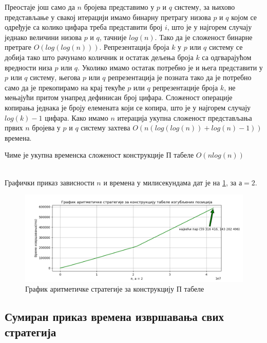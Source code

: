 \documentclass[a4paper]{article}
\begin{document}
Преостаје још само да $ n $ бројева представимо у $ p $ и $ q $ систему, за њихово представљање у свакој итерацији имамо бинарну претрагу низова $ p $ и $ q $ којом се одређује са колико цифара треба представити број $ i $, што је у најгорем случају једнако величини низова $ p $ и $ q $, тачније $ log(n) $. Тако да је сложеност бинарне претраге $ O(log(log(n))) $. Репрезентација броја $ k $ у $ p $ или $ q $ систему се добија тако што рачунамо количник и остатак дељења броја $ k $ са одгварајућом вредности низа $ p $ или $ q $. Уколико имамо остатак потребно је и њега представити у $ p $ или $ q $ систему, његова $ p $ или $ q $ репрезентација је позната тако да је потребно само да је прекопирамо на крај текуће $ p $ или $ q $ репрезентације броја $ k $, не мењајући притом унапред дефинисан број цифара. Сложеност операције копирања једнака је броју елемената који се копира, што је у најгорем случају $ log(k) - 1 $ цифара. Како имамо $ n $ итерација укупна сложеност представљања првих $ n $ бројева у $ p $ и $ q $ систему захтева $ O(n(log(log(n)) + log(n) - 1)) $ времена.

Чиме је укупна временска сложеност конструкције П табеле $ O(nlog(n)) $



\leavevmode\\
Графички приказ зависности $ n $ и времена у милисекундама дат је на \ref{fig:arithmetic}, за $ а = 2 $.

\begin{figure}[H]
	\caption{График аритметичке стратегије за конструкцију П табеле}
	\label{fig:arithmetic}
	\begin{center}
		\includegraphics[width=\textwidth]{arithmetic.png}
	\end{center}
\end{figure}

\subsection{Сумиран приказ времена извршавања свих стратегија}
\end{document}
